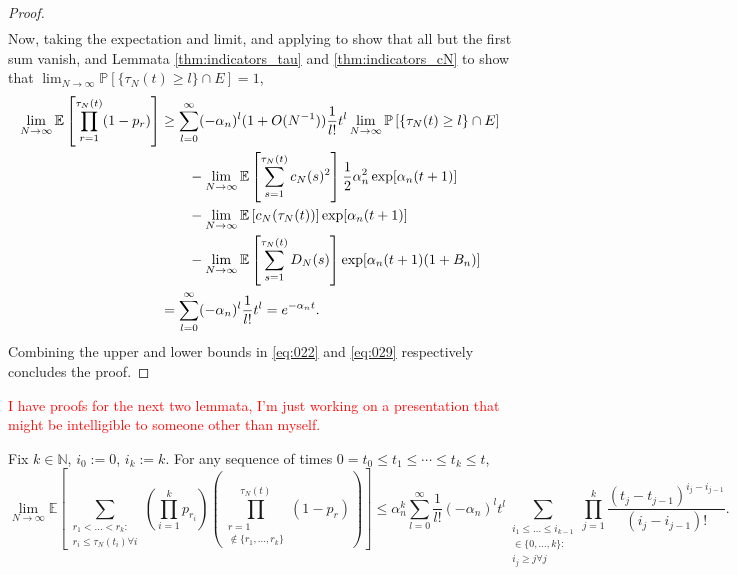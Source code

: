 \documentclass{article}
\newcommand{\seb}[1]{\xspace\textcolor{red}{#1}\xspace}
\newcommand{\Prob}{\mathbb{P}}
\newcommand{\E}{\mathbb{E}}
\newcommand{\1}[1]{\mathbbm{1}_{#1}}
\begin{document}
\begin{proof}
\begin{align}
\end{align}
Now, taking the expectation and limit, and applying \citet[Equations (3.3)--(3.5)]{brown2021} to show that all but the first sum vanish, and Lemmata \ref{thm:indicators_tau} and \ref{thm:indicators_cN} to show that $\lim_{N\to\infty} \Prob[ \{\tau_N(t) \geq l\} \cap E ] =1$,
\begin{align}
\lim_{N\to\infty} \E \left[ \prod_{r=1}^{\tau_N(t)} (1-p_r) \right]
&\geq \sum_{l=0}^{\infty} (-\alpha_n)^l (1+O(N^{-1})) \frac{1}{l!} t^l 
        \lim_{N\to\infty} \Prob\left[ \{\tau_N(t) \geq l\} \cap E \right] \notag\\
    &\qquad- \lim_{N\to\infty} \E \left[ \sum_{s=1}^{\tau_N(t)} c_N(s)^2 \right]
        \frac{1}{2} \alpha_n^2 \exp[ \alpha_n (t+1) ]\notag\\
    &\qquad- \lim_{N\to\infty} \E \left[ c_N(\tau_N(t)) \right] 
        \exp[ \alpha_n (t+1) ] \notag\\
    &\qquad- \lim_{N\to\infty} \E \left[ \sum_{s=1}^{\tau_N(t)} D_N(s) \right]
        \exp[ \alpha_n (t+1) (1+B_n) ] \notag\\
&= \sum_{l=0}^{\infty} (-\alpha_n)^l \frac{1}{l!} t^l
= e^{-\alpha_n t}. \label{eq:029}
\end{align}
Combining the upper and lower bounds in \eqref{eq:022} and \eqref{eq:029} respectively concludes the proof.
\end{proof}

\seb{I have proofs for the next two lemmata, I'm just working on a presentation that might be intelligible to someone other than myself.}
\begin{lemma}\label{thm:inductionUB}
Fix $k \in \mathbb{N}$, $i_0:=0$, $i_k:=k$. For any sequence of times
$0 = t_0 \leq t_1 \leq \cdots \leq t_k \leq t$,
\begin{equation}
\lim_{N\to\infty} \E \left[ 
        \sum_{\substack{r_1 <\dots< r_k :\\ r_i \leq \tau_N(t_i) \forall i}}
        \left( \prod_{i=1}^k p_{r_i} \right)
        \left( \prod_{\substack{r=1 \\ \notin \{r_1,\dots,r_k\} }}^{\tau_N(t)} 
        (1-p_r) \right) \right]
\leq \alpha_n^k \sum_{l=0}^\infty \frac{1}{l!} (-\alpha_n)^l t^l 
        \sum_{\substack{i_1\leq \dots\leq i_{k-1}\\ \in \{0,\dots,k\} :
        \\ i_j \geq j \forall j}} 
        \prod_{j=1}^k \frac{(t_j - t_{j-1})^{i_j - i_{j-1}}}{(i_j - i_{j-1})! } .
\end{equation}
\end{lemma}
\end{document}
